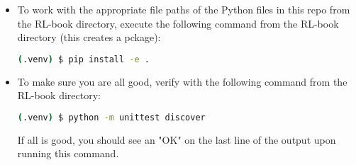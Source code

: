 \documentclass[12pt]{exam}
\begin{document}
\begin{questions}
\begin{itemize}
\begin{lstlisting}[language=bash]
(.venv) $ pip install -r requirements.txt
\end{lstlisting}
\item To work with the appropriate file paths of the Python files in this repo from the RL-book directory, execute the following command from the RL-book directory (this creates a pckage):
\begin{lstlisting}[language=bash]
(.venv) $ pip install -e .
\end{lstlisting}
\item To make sure you are all good, verify with the following command from the RL-book directory:
\begin{lstlisting}[language=bash]
(.venv) $ python -m unittest discover
\end{lstlisting}
If all is good, you should see an "OK" on the last line of the output upon running this command.
\end{itemize}
\end{questions}
\end{document}
